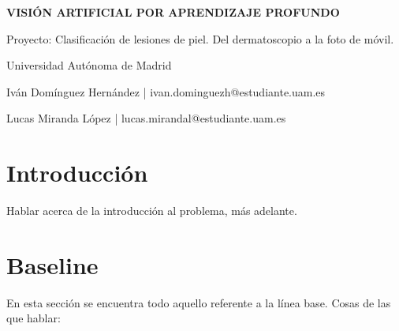 \documentclass[10pt,a4paper]{article}
\renewcommand{\_}{\guionbajo\allowbreak}
\begin{document}
\sloppy

\begin{titlepage}
    \centering
    \vfill
    {\huge \textbf{VISIÓN ARTIFICIAL POR APRENDIZAJE PROFUNDO} \par}
    \vspace{2cm}
    {\Large Proyecto: Clasificación de lesiones de piel. Del dermatoscopio a la foto de móvil. \par}
    \vspace{1cm}
    {\Large Universidad Autónoma de Madrid \par}
    \vspace{1cm}
    {\large Iván Domínguez Hernández |  ivan.dominguezh@estudiante.uam.es \par}
    \vspace{.5cm}
    {\large Lucas Miranda López | lucas.mirandal@estudiante.uam.es \par}
    \vspace{1cm}
\end{titlepage}

\tableofcontents

\newpage


\section*{Introducción}

\noindent Hablar acerca de la introducción al problema, más adelante. 

\section{Baseline}

\noindent En esta sección se encuentra todo aquello referente a la línea base. Cosas de las que hablar:
\end{document}
